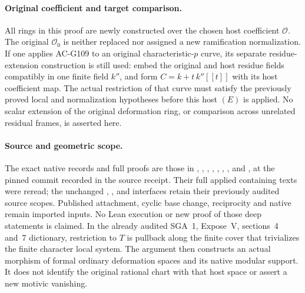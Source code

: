 \paragraph{Original coefficient and target comparison.}
All rings in this proof are newly constructed over the chosen
host coefficient \(\mathcal O\).  The original \(\mathcal O_0\)
is neither replaced nor assigned a new ramification normalization.
If one applies AC-G109 to an original characteristic-\(p\) curve,
its separate residue-extension construction is still used:
embed the original and host residue fields compatibly in one
finite field \(k''\), and form \(C=k+t\,k''[[t]]\) with its
host coefficient map.  The actual restriction of that curve
must satisfy the previously proved local and normalization
hypotheses before this host \((E)\) is applied.
No scalar extension of the original deformation ring, or
comparison across unrelated residual frames, is asserted here.

\paragraph{Source and geometric scope.}
The exact native records and full proofs are those in
, ,
,
,
, ,
, and ,
at the pinned commit recorded in the source receipt.
Their full applied containing texts were reread; the unchanged
, , and  interfaces
retain their previously audited source scopes.
Published attachment, cyclic base change, reciprocity and
native  remain imported inputs.  No Lean execution
or new proof of those deep statements is claimed.
In the already audited SGA~1, Expose~V, sections~4 and~7
dictionary, restriction to \(T\) is pullback along the finite
cover that trivializes the finite character local system.
The argument then constructs an actual morphism of formal
ordinary deformation spaces and its native modular support.
It does not identify the original rational chart with that
host space or assert a new motivic vanishing.
